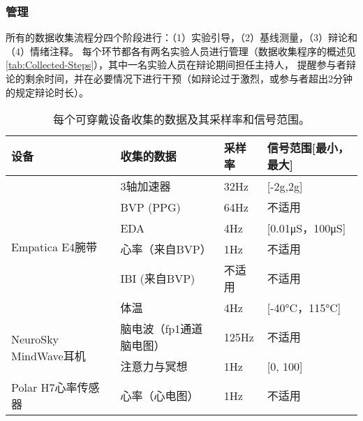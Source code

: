 \subsubsection{管理}
所有的数据收集流程分四个阶段进行：（1）实验引导，（2）基线测量，（3）辩论和（4）情绪注释。
每个环节都各有两名实验人员进行管理（数据收集程序的概述见\autoref{tab:Collected-Steps}），其中一名实验人员在辩论期间担任主持人，
提醒参与者辩论的剩余时间，并在必要情况下进行干预（如辩论过于激烈，或参与者超出2分钟的规定辩论时长）。
\begin{table}[htbp]
    \centering
    \footnotesize
    \setlength{\abovecaptionskip}{-0.1cm}
    \setlength{\belowcaptionskip}{0.2cm}
    \renewcommand\arraystretch{1.5}
    \caption[每个可穿戴设备收集的数据及其采样率和信号范围。]{每个可穿戴设备收集的数据及其采样率和信号范围。}
    \label{tab:Collected-Data}
    \begin{tabular}{|l|l|p{2cm}|l|}
    \hline
    设备                                   & 收集的数据         & 采样率   & 信号范围[最小，最大]    \\ \hline
    \multirow{6}{*}{Empatica E4腕带}       & 3轴加速器         & 32Hz  & [-2g,2g]       \\ \cline{2-4} 
                                         & BVP (PPG)     & 64Hz  & 不适用            \\ \cline{2-4} 
                                         & EDA           & 4Hz   & [0.01μS，100μS] \\ \cline{2-4} 
                                         & 心率（来自BVP）     & 1Hz   & 不适用            \\ \cline{2-4} 
                                         & IBI (来自BVP)   & 不适用   & 不适用            \\ \cline{2-4} 
                                         & 体温            & 4Hz   & [-40°C，115°C]  \\ \hline
    \multirow{2}{*}{NeuroSky MindWave耳机} & 脑电波（fp1通道脑电图） & 125Hz & 不适用            \\ \cline{2-4} 
                                         & 注意力与冥想        & 1Hz   & [0, 100]       \\ \hline
    Polar H7心率传感器                        & 心率（心电图）       & 1Hz   & 不适用            \\ \hline
    \end{tabular}
    \end{table}
